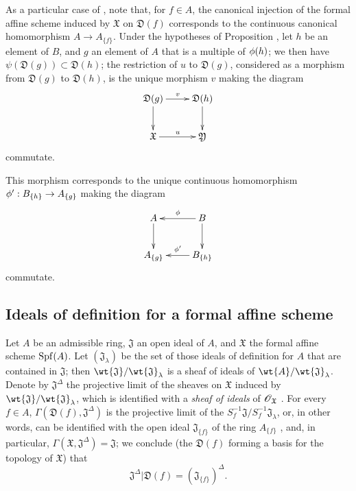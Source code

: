 \begin{env}[10.2.3]
\label{1.10.2.3}
As a particular case of , note that, for $f\in A$, the canonical injection of the formal affine scheme induced by $\mathfrak{X}$ on $\mathfrak{D}(f)$ corresponds to the continuous canonical homomorphism $A\to A_{\{f\}}$.
Under the hypotheses of Proposition , let $h$ be an element of $B$, and $g$ an element of $A$ that is a multiple of $\phi(h)$;
we then have $\psi(\mathfrak{D}(g))\subset\mathfrak{D}(h)$; the restriction of $u$ to $\mathfrak{D}(g)$, considered as a morphism from $\mathfrak{D}(g)$ to $\mathfrak{D}(h)$, is the unique morphism $v$ making the diagram
\[
  \xymatrix{
    \mathfrak{D}(g)\ar[r]^v\ar[d] &
    \mathfrak{D}(h)\ar[d]\\
    \mathfrak{X}\ar[r]^u &
    \mathfrak{Y}
  }
\]
commutate.

This morphism corresponds to the unique continuous homomorphism $\vphi':B_{\{h\}}\to A_{\{g\}}$  making the diagram
\[
  \xymatrix{
    A\ar[d] &
    B\ar[l]_\vphi\ar[d]\\
    A_{\{g\}} &
    B_{\{h\}}\ar[l]_{\vphi'}
  }
\]
commutate.
\end{env}

\subsection{Ideals of definition for a formal affine scheme}
\label{subsection:1.10.3}

\begin{env}[10.3.1]
\label{1.10.3.1}
Let $A$ be an admissible ring, $\mathfrak{J}$ an open ideal of $A$, and $\mathfrak{X}$ the formal affine scheme $\operatorname{Spf}(A)$.
Let $(\mathfrak{J}_\lambda)$ be the set of those ideals of definition for $A$ that are contained in $\mathfrak{J}$; then $\wt{\mathfrak{J}}/\wt{\mathfrak{J}}_\lambda$ is a sheaf of ideals of $\wt{A}/\wt{\mathfrak{J}}_\lambda$.
Denote by $\mathfrak{J}^\Delta$ the projective limit of the sheaves on $\mathfrak{X}$ induced by $\wt{\mathfrak{J}}/\wt{\mathfrak{J}}_\lambda$, which is identified with a \emph{sheaf of ideals} of $\mathscr{O}_\mathfrak{X}$ .
For every $f\in A$, $\Gamma(\mathfrak{D}(f),\mathfrak{J}^\Delta)$ is the projective limit of the $S_f^{-1}\mathfrak{J}/S_f^{-1}\mathfrak{J}_\lambda$, or, in other words, can be identified with the open ideal $\mathfrak{J}_{\{f\}}$ of the ring $A_{\{f\}}$ , and, in particular, $\Gamma(\mathfrak{X},\mathfrak{J}^\Delta)=\mathfrak{J}$; we conclude (the $\mathfrak{D}(f)$ forming a basis for the topology of $\mathfrak{X}$) that
\begin{equation*}
\label{1.10.3.1.1}
  \mathfrak{J}^\Delta|\mathfrak{D}(f)=(\mathfrak{J}_{\{f\}})^\Delta.
  \tag{10.3.1.1}
\end{equation*}
\end{env}

